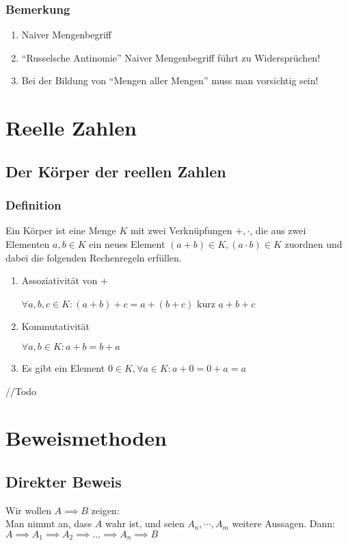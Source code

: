 \documentclass{article}
\begin{document}
    \subsubsection{Bemerkung}
      \begin{enumerate}[label=(\roman*)]
        \item Naiver Mengenbegriff
        \item \enquote{Russelsche Antinomie} Naiver Mengenbegriff führt zu Widersprüchen!
        \item Bei der Bildung von \enquote{Mengen aller Mengen} muss man vorsichtig sein!
      \end{enumerate}

\section{Reelle Zahlen}
  \subsection{Der Körper der reellen Zahlen}
    \subsubsection{Definition}
      Ein Körper ist eine Menge $K$ mit zwei Verknüpfungen $+, \cdot$, die aus
      zwei Elementen $a,b \in K$ ein neues Element
      $(a+b) \in K, (a \cdot b) \in K$ zuordnen und dabei die folgenden
      Rechenregeln erfüllen.

      \begin{enumerate}[label=(A\arabic*)]
        \item Assoziativität von $+$

          $\forall a,b,c \in K: (a+b)+c = a+(b+c)$ kurz $a+b+c$
        \item Kommutativität

          $\forall a,b \in K: a+b=b+a$

        \item Es gibt ein Element $0 \in K, \forall a \in K: a+0 = 0+a = a$
      \end{enumerate}
      //Todo

\section{Beweismethoden}
  \subsection{Direkter Beweis}
    Wir wollen $A \implies B$ zeigen:\\
    Man nimmt an, dass $A$ wahr ist, und seien $A_n,\cdots,A_m$
    weitere Aussagen. Dann:\\
    $A \implies A_1 \implies A_2 \implies \dots \implies A_n \implies B$
\end{document}

